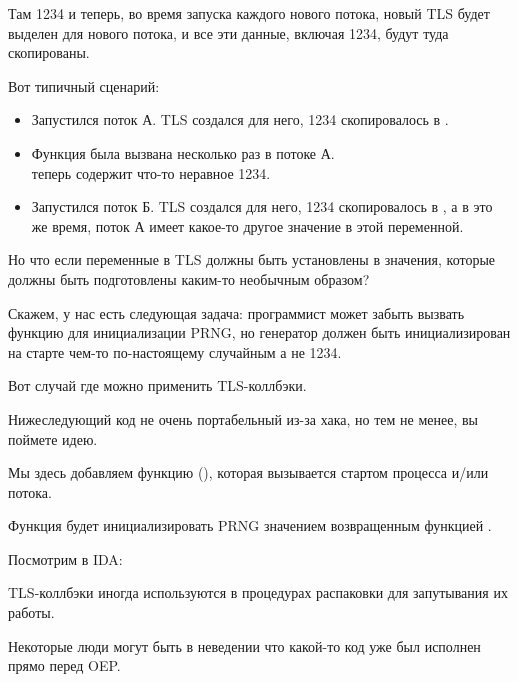 Там 1234 и теперь, во время запуска каждого нового потока, новый \ac{TLS} будет выделен для нового потока,
и все эти данные, включая 1234, будут туда скопированы.

Вот типичный сценарий:

\begin{itemize}
\item Запустился поток А. \ac{TLS} создался для него, 1234 скопировалось в .

\item Функция  была вызвана несколько раз в потоке А. \\
 теперь содержит что-то неравное 1234.

\item Запустился поток Б. \ac{TLS} создался для него, 1234 скопировалось в , 
а в это же время, поток А имеет какое-то другое значение в этой переменной.
\end{itemize}


Но что если переменные в \ac{TLS} должны быть установлены в значения, которые должны быть подготовлены
каким-то необычным образом?

Скажем, у нас есть следующая задача:
программист может забыть вызвать функцию  для инициализации \ac{PRNG}, но генератор должен быть
инициализирован на старте чем-то по-настоящему случайным а не 1234.

Вот случай где можно применить \ac{TLS}-коллбэки.

Нижеследующий код не очень портабельный из-за хака, но тем не менее, вы поймете идею.

Мы здесь добавляем функцию (), которая вызывается  стартом процесса и/или потока.

Функция будет инициализировать \ac{PRNG} значением возвращенным функцией .



Посмотрим в IDA:



TLS-коллбэки иногда используются в процедурах распаковки для запутывания их работы.

Некоторые люди могут быть в неведении что какой-то код уже был исполнен прямо перед \ac{OEP}.

